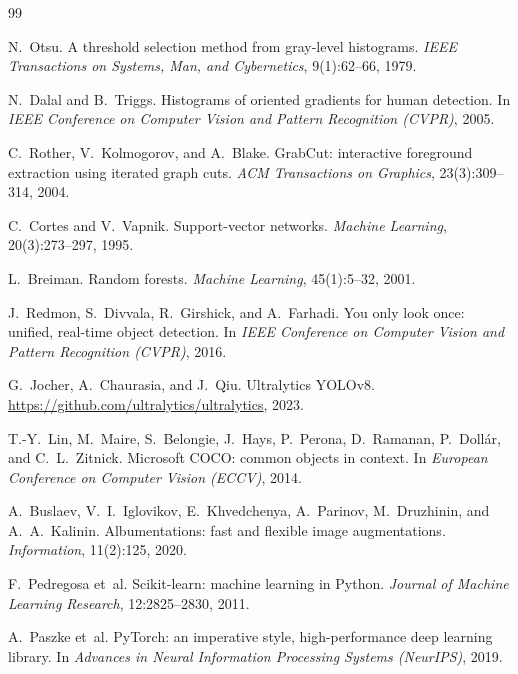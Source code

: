 \documentclass[11pt,a4paper]{article}
\begin{document}
\begin{thebibliography}{99}

N.~Otsu.
\newblock A threshold selection method from gray-level histograms.
\newblock \emph{IEEE Transactions on Systems, Man, and Cybernetics}, 9(1):62--66, 1979.

N.~Dalal and B.~Triggs.
\newblock Histograms of oriented gradients for human detection.
\newblock In \emph{IEEE Conference on Computer Vision and Pattern Recognition (CVPR)}, 2005.

C.~Rother, V.~Kolmogorov, and A.~Blake.
\newblock GrabCut: interactive foreground extraction using iterated graph cuts.
\newblock \emph{ACM Transactions on Graphics}, 23(3):309--314, 2004.

C.~Cortes and V.~Vapnik.
\newblock Support-vector networks.
\newblock \emph{Machine Learning}, 20(3):273--297, 1995.

L.~Breiman.
\newblock Random forests.
\newblock \emph{Machine Learning}, 45(1):5--32, 2001.

J.~Redmon, S.~Divvala, R.~Girshick, and A.~Farhadi.
\newblock You only look once: unified, real-time object detection.
\newblock In \emph{IEEE Conference on Computer Vision and Pattern Recognition (CVPR)}, 2016.

G.~Jocher, A.~Chaurasia, and J.~Qiu.
\newblock Ultralytics YOLOv8.
\newblock \url{https://github.com/ultralytics/ultralytics}, 2023.

T.-Y.~Lin, M.~Maire, S.~Belongie, J.~Hays, P.~Perona, D.~Ramanan, P.~Doll\'ar, and C.~L.~Zitnick.
\newblock Microsoft COCO: common objects in context.
\newblock In \emph{European Conference on Computer Vision (ECCV)}, 2014.

A.~Buslaev, V.~I.~Iglovikov, E.~Khvedchenya, A.~Parinov, M.~Druzhinin, and A.~A.~Kalinin.
\newblock Albumentations: fast and flexible image augmentations.
\newblock \emph{Information}, 11(2):125, 2020.

F.~Pedregosa et~al.
\newblock Scikit-learn: machine learning in Python.
\newblock \emph{Journal of Machine Learning Research}, 12:2825--2830, 2011.

A.~Paszke et~al.
\newblock PyTorch: an imperative style, high-performance deep learning library.
\newblock In \emph{Advances in Neural Information Processing Systems (NeurIPS)}, 2019.

\end{thebibliography}
\end{document}
